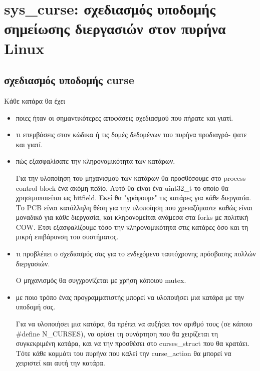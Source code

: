 \documentclass[a4paper,10pt]{article} \usepackage{anysize}
\begin{document}
\renewcommand{\theenumi}{\roman{enumi}}


\section*{sys\_curse: σχεδιασμός υποδομής σημείωσης διεργασιών στον πυρήνα Linux}
\subsection*{σχεδιασμός υποδομής curse}
Κάθε κατάρα θα έχει
\begin{itemize}
    \item ποιες ήταν οι σημαντικότερες αποφάσεις σχεδιασμού που πήρατε και γιατί.



    \item τι επεμβάσεις στον κώδικα ή τις δομές δεδομένων του πυρήνα προδιαγρά-
        ψατε και γιατί.


    \item πώς εξασφαλίσατε την κληρονομικότητα των κατάρων.

        Για την υλοποίηση του μηχανισμού των κατάρων θα προσθέσουμε στο
        process control block ένα ακόμη πεδίο. Αυτό θα είναι ένα uint32\_t το
        οποίο θα χρησιμοποιείται ως bitfield. Εκεί θα "γράφουμε" τις κατάρες
        για κάθε διεργασία. Το PCB είναι κατάλληλη θέση για την υλοποίηση που
        χρειαζόμαστε καθώς είναι μοναδικό για κάθε διεργασία, και
        κληρονομείται ανάμεσα στα forks με πολιτική COW. Έτσι εξασφαλίζουμε
        τόσο την κληρονομικότητα στις κατάρες όσο και τη μικρή επιβάρυνση του
        συστήματος.

    \item τι προβλέπει ο σχεδιασμός σας για το ενδεχόμενο ταυτόχρονης πρόσβασης
        πολλών διεργασιών.

        Ο μηχανισμός θα συγχρονίζεται με χρήση κάποιου mutex.

    \item με ποιο τρόπο ένας προγραμματιστής μπορεί να υλοποιήσει μια κατάρα με
        την υποδομή σας.

        Για να υλοποιήσει μια κατάρα, θα πρέπει να αυξήσει τον αριθμό τους
        (σε κάποιο \#define N\_CURSES), να ορίσει τη συνάρτηση που θα χειρίζεται
        τη συγκεκριμένη κατάρα, και να την προσθέσει στο curses\_struct που θα
        κρατάει. Τότε κάθε κομμάτι του πυρήνα που καλεί την curse\_action θα
        μπορεί να χειριστεί και αυτή την κατάρα. 


\end{itemize}
\end{document}
